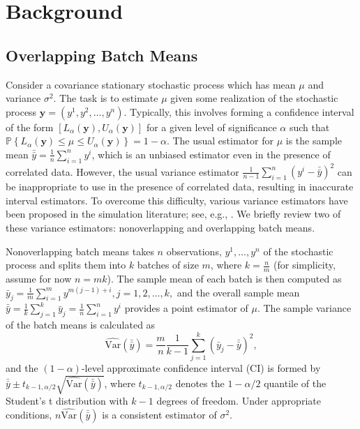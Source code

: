 \documentclass{article}
\newcommand{\p}[1]{\mathbb{P} \left\{ #1 \right\}}
\newcommand{\varhat}{\widehat{\mathrm{Var}}}
\newcommand{\y}{\mathbf{y}}
\newcommand{\yb}{\bar{y}}
\newcommand{\ybb}{\bar{\yb}}
\begin{document}
\section{Background}
\label{sec:background}

\subsection{Overlapping Batch Means} \label{ssec:obm}
Consider a covariance stationary stochastic process which has mean $\mu$ and variance $\sigma^2$.  
The task is to estimate $\mu$ given some realization of the stochastic process $\y = (y^1, y^2, \dots, y^n)$.  
Typically, this involves forming a confidence interval of the form $[L_\alpha(\y), U_\alpha(\y)]$ for a given level of significance $\alpha$ such that $\p{L_\alpha(\y) \leq \mu \leq U_\alpha(\y)} = 1 - \alpha$.  
The usual estimator for $\mu$ is the sample mean $\ybb = \frac{1}{n} \sum_{i=1}^n y^i$, which is an unbiased estimator even in the presence of correlated data.  
However, the usual variance estimator $\frac{1}{n-1} \sum_{i=1}^n (y^i - \ybb)^2$ can be inappropriate to use in the presence of correlated data, resulting in inaccurate interval estimators.  
To overcome this difficulty, various variance estimators have been proposed in the simulation literature; see, e.g., \cite{law_07}.  
We briefly review two of these variance estimators: nonoverlapping and overlapping batch means.

Nonoverlapping batch means takes $n$ observations, $y^1, \dots, y^n$ of the stochastic process and splits them into $k$ batches of size $m$, where $k = \frac{n}{m}$ (for simplicity, assume for now $n = mk$).  
The sample mean of each batch is then computed as
$
	\yb_j = \frac{1}{m} \sum_{i=1}^{m} y^{m(j-1)+i}, j = 1,2, \dots, k,
$
and the overall sample mean $\ybb = \frac{1}{k} \sum_{j=1}^k \yb_j = \frac{1}{n} \sum_{i=1}^n y^i$ provides a point estimator of $\mu$.  
The sample variance of the batch means is calculated as
\begin{equation} \label{eq:var}
	\varhat(\ybb) = \frac{m}{n}\frac{1}{k-1} \sum_{j=1}^k \left( \yb_j - \ybb \right)^2,
\end{equation}
and the $(1-\alpha)$-level approximate confidence interval (CI) is formed by $\ybb \pm t_{k-1,\alpha/2} \sqrt{\varhat(\ybb)}$, where $t_{k-1,\alpha/2}$ denotes the $1-\alpha/2$ quantile of the Student's t distribution with $k-1$ degrees of freedom.  
Under appropriate conditions, $n\varhat(\ybb)$ is a consistent estimator of $\sigma^2$.
\end{document}
